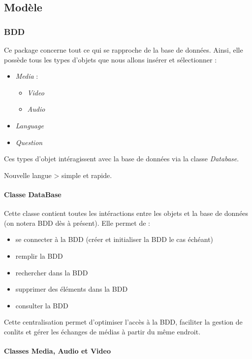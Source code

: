 \subsection{Modèle}


\subsubsection{BDD}

Ce package concerne tout ce qui se rapproche de la base de données. Ainsi, elle possède tous les types d'objets que nous allons insérer et sélectionner :
\begin{itemize}
 \item \textit{Media} :
 \begin{itemize}
  \item \textit{Video}
  \item \textit{Audio}
 \end{itemize}
 \item \textit{Language}
 \item \textit{Question}
\end{itemize}


Ces types d'objet intéragissent avec la base de données via la classe \textit{Database}.

Nouvelle langue > simple et rapide.

\paragraph{Classe DataBase}

Cette classe contient toutes les intéractions entre les objets et la base de données (on notera BDD dès à présent). Elle permet de :

\begin{itemize}
 \item se connecter à la BDD (créer et initialiser la BDD le cas échéant)
 \item remplir la BDD
 \item rechercher dans la BDD
 \item supprimer des éléments dans la BDD
 \item consulter la BDD
\end{itemize}


Cette centralisation permet d'optimiser l'accès à la BDD, faciliter la gestion de conlits et gérer les échanges de médias à partir du même endroit.

\paragraph{Classes Media, Audio et Video}

